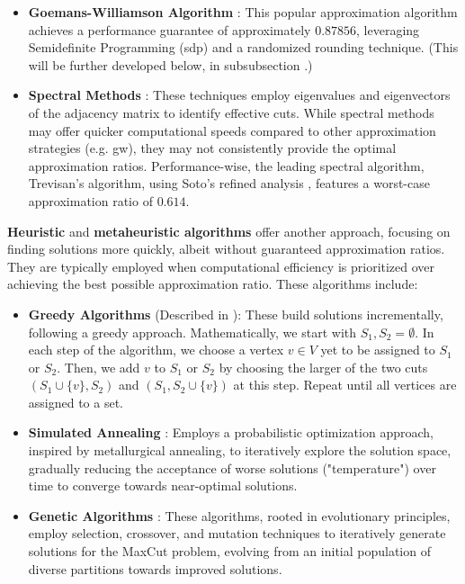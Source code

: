 \begin{itemize}
  \item \textbf{Goemans-Williamson Algorithm} \cite{GW-Algorithm}: This popular approximation algorithm achieves a performance guarantee of approximately $0.87856$, leveraging Semidefinite Programming (\acrshort{sdp}) and a randomized rounding technique. (This will be further developed below, in subsubsection .)
  \item \textbf{Spectral Methods} \cite{Spectral-MaxCut}: These techniques employ eigenvalues and eigenvectors of the adjacency matrix to identify effective cuts. While spectral methods may offer quicker computational speeds compared to other approximation strategies (e.g. \acrshort{gw}), they may not consistently provide the optimal approximation ratios. Performance-wise, the leading spectral algorithm, Trevisan's algorithm, using Soto's refined analysis \cite{Soto-MaxCut}, features a worst-case approximation ratio of $0.614$.
\end{itemize}

\textbf{Heuristic} and \textbf{metaheuristic algorithms} offer another approach, focusing on finding solutions more quickly, albeit without guaranteed approximation ratios. They are typically employed when computational efficiency is prioritized over achieving the best possible approximation ratio. These algorithms include:
\begin{itemize}
  \item \textbf{Greedy Algorithms} (Described in \cite{Spectral-MaxCut}): These build solutions incrementally, following a greedy approach. Mathematically, we start with $S_1, S_2 = \emptyset$. In each step of the algorithm, we choose a vertex $v \in V$ yet to be assigned to $S_1$ or $S_2$. Then, we add $v$ to $S_1$ or $S_2$ by choosing the larger of the two cuts $(S_1 \cup \{v\}, S_2)$ and $(S_1, S_2 \cup \{v\})$ at this step. Repeat until all vertices are assigned to a set.
  \item \textbf{Simulated Annealing} \cite{SA_MaxCut}: Employs a probabilistic optimization approach, inspired by metallurgical annealing, to iteratively explore the solution space, gradually reducing the acceptance of worse solutions ("temperature") over time to converge towards near-optimal solutions.
  \item \textbf{Genetic Algorithms} \cite{GA_MaxCut}: These algorithms, rooted in evolutionary principles, employ selection, crossover, and mutation techniques to iteratively generate solutions for the MaxCut problem, evolving from an initial population of diverse partitions towards improved solutions.
\end{itemize}

